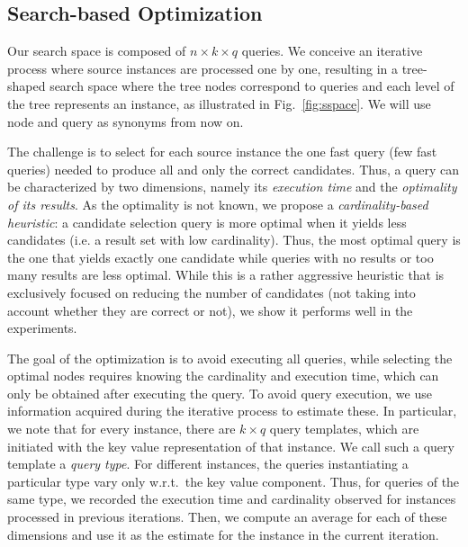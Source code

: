 \subsection{Search-based Optimization} 
Our search space is composed of $n \times k \times q$ queries. We conceive an iterative process where source instances are processed one by one, resulting in a tree-shaped search space where the tree nodes correspond to queries and each level of the tree represents an instance, as illustrated in Fig.~\ref{fig:sspace}. We will use node and query as synonyms from now on.

The challenge is to select for each source instance the one fast query (few fast queries) needed to produce all and only the correct candidates. Thus, a query can be characterized by two dimensions, namely its \emph{execution time} and the \emph{optimality of its results}. As the optimality is not known, we propose a \emph{cardinality-based heuristic}: a candidate selection query is more optimal when it yields less candidates (i.e. a result set with low cardinality). Thus, the most optimal query is the one that yields exactly one candidate while queries with no results or too many results are less optimal. While this is a rather aggressive heuristic that is exclusively focused on reducing the number of candidates (not taking into account whether they are correct or not), we show it performs well in the experiments. 

The goal of the optimization is to avoid executing all queries, while selecting the optimal nodes requires knowing the cardinality and execution time, which can only be obtained after executing the query. To avoid query execution, we use information acquired during the iterative process to estimate these. In particular, we note that for every instance, there are $k \times q$ query templates, which are initiated with the key value representation of that instance. We call such a query template a \emph{query type}. For different instances, the queries instantiating a particular type vary only w.r.t.~the key value component. Thus, for queries of the same type, we recorded the execution time and cardinality observed for instances processed in previous iterations. Then, we compute an average for each of these dimensions and use it as the estimate for the instance in the current iteration. 

